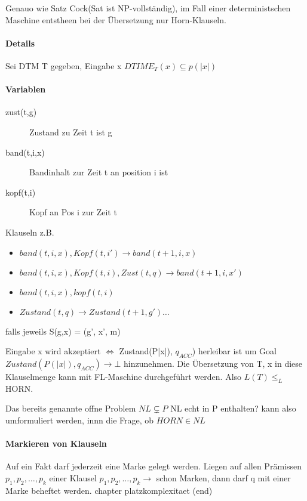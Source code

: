 \begin{beweis}
Genauo wie Satz Cock(Sat ist NP-vollständig), im Fall einer
deterministschen Maschine entstheen bei der Übersetzung nur
Horn-Klauseln.
\paragraph{Details}
Sei DTM T gegeben, Eingabe x $DTIME_T(x) \subseteq p(|x|)$
\paragraph{Variablen}
\begin{description}
\item[zust(t,g)] Zustand zu Zeit t ist g
\item[band(t,i,x)] Bandinhalt zur Zeit t an position i ist
\item[kopf(t,i)] Kopf an Pos i zur Zeit t
\end{description}

Klauseln z.B.
\begin{itemize}
\item $band(t,i,x), Kopf(t,i') \rightarrow band(t+1, i,x)$
\item $band(t,i,x), Kopf(t,i), Zust(t,q) \rightarrow band(t+1, i, x')$
\item $band(t,i,x), kopf(t,i)$
\item $Zustand(t,q) \rightarrow Zustand(t+1, g')\dots$
\end{itemize}
falls jeweils S(g,x) = (g', x', m)

Eingabe x wird akzeptiert $\Leftrightarrow$ Zustand(P|x|), $q_{ACC}$)
herleibar ist um Goal $Zustand(P(|x|), q_{ACC}) \rightarrow \bot$
hinzunehmen.  Die Übersetzung von T, x in diese Klauselmenge kann mit
FL-Maschine durchgeführt werden. Also $L(T) \leq_{L}$ HORN.
\end{beweis}

Das bereits genannte offne Problem $NL \subsetneq P$ NL echt in P enthalten?
kann also umformuliert werden, innn die Frage, ob $HORN \in NL$

\paragraph{Markieren von Klauseln}
Auf ein Fakt darf jederzeit eine Marke gelegt werden. Liegen auf allen
Prämissen $p_1, p_2, \dots, p_k$ einer Klausel
$p_1, p_2, \dots, p_k \rightarrow$ schon Marken,
dann darf q mit einer Marke beheftet werden.
chapter platzkomplexitaet (end)
